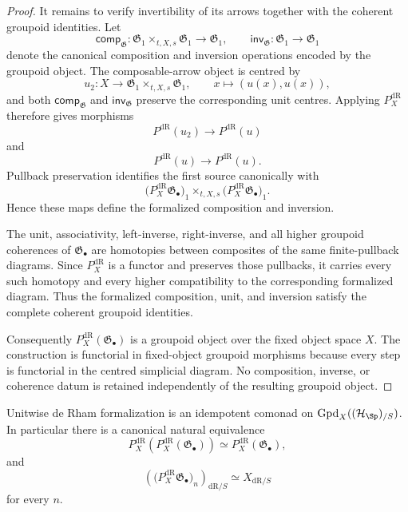 \begin{proof}
It remains to verify invertibility of its arrows together with the coherent
groupoid identities.  Let
\[
    \mathsf{comp}_{\mathfrak G}:
    \mathfrak G_1\times_{t,X,s}\mathfrak G_1
    \longrightarrow
    \mathfrak G_1,
    \qquad
    \mathsf{inv}_{\mathfrak G}:
    \mathfrak G_1\longrightarrow\mathfrak G_1
\]
denote the canonical composition and inversion operations encoded by the
groupoid object.  The composable-arrow object is centred by
\[
    u_2:X\longrightarrow
    \mathfrak G_1\times_{t,X,s}\mathfrak G_1,
    \qquad
    x\longmapsto(u(x),u(x)),
\]
and both $\mathsf{comp}_{\mathfrak G}$ and $\mathsf{inv}_{\mathfrak G}$ preserve the corresponding unit centres.  Applying
$P_X^{\mathrm{dR}}$ therefore gives morphisms
\[
    P^{\mathrm{dR}}(u_2)
    \longrightarrow
    P^{\mathrm{dR}}(u)
\]
and
\[
    P^{\mathrm{dR}}(u)
    \longrightarrow
    P^{\mathrm{dR}}(u).
\]
Pullback preservation identifies the first source canonically with
\[
    \bigl(P_X^{\mathrm{dR}}\mathfrak G_\bullet\bigr)_1
    \times_{t,X,s}
    \bigl(P_X^{\mathrm{dR}}\mathfrak G_\bullet\bigr)_1.
\]
Hence these maps define the formalized composition and inversion.

The unit, associativity, left-inverse, right-inverse, and all higher groupoid
coherences of $\mathfrak G_\bullet$ are homotopies between composites of the
same finite-pullback diagrams.  Since $P_X^{\mathrm{dR}}$ is a functor and preserves those
pullbacks, it carries every such homotopy and every higher compatibility to
the corresponding formalized diagram.  Thus the formalized composition,
unit, and inversion satisfy the complete coherent groupoid identities.

Consequently
$P_X^{\mathrm{dR}}(\mathfrak G_\bullet)$ is a groupoid object over
the fixed object space $X$.  The construction is functorial in
fixed-object groupoid morphisms because every step is functorial in the
centred simplicial diagram.  No composition, inverse, or coherence datum is
retained independently of the resulting groupoid object.
\end{proof}

\begin{theorem}
\label{thm:unitwise-formalization-idempotent}
Unitwise de Rham formalization is an idempotent comonad on
$\operatorname{Gpd}_X((\mathcal H_{\Sp})_{/S})$.  In particular there is a canonical
natural equivalence
\[
    P_X^{\mathrm{dR}}\!\left(
        P_X^{\mathrm{dR}}(\mathfrak G_\bullet)
    \right)
    \simeq
    P_X^{\mathrm{dR}}(\mathfrak G_\bullet),
\]
and
\[
    \left(
        \bigl(P_X^{\mathrm{dR}}\mathfrak G_\bullet\bigr)_n
    \right)_{\mathrm{dR}/S}
    \simeq
    X_{\mathrm{dR}/S}
\]
for every $n$.
\end{theorem}

